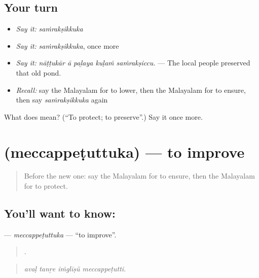 \subsection*{Your turn}
\begin{itemize}
\raggedright
  \item \emph{Say it:} \emph{saṁrakṣikkuka}
  \item \emph{Say it:} \emph{saṁrakṣikkuka}, once more
  \item \emph{Say it:} \emph{nāṭṭukār ā paḻaya kuḷaṁ saṁrakṣiccu.} — The local people preserved that old pond.
  \item \emph{Recall:} say the Malayalam for to lower, then the Malayalam for to ensure, then say \emph{saṁrakṣikkuka} again
\end{itemize}

\begin{tcolorbox}[breakable,colback=teal!4,colframe=teal!35!black,title={Before you move on}]
What does  mean? (\textquotedblleft{}To protect; to preserve\textquotedblright{}.) Say it once more.
\end{tcolorbox}
\section[\texorpdfstring{\ml{മെച്ചപ്പെടുത്തുക} (meccappeṭuttuka)}{മെച്ചപ്പെടുത്തുക (meccappeṭuttuka)}]{ (meccappeṭuttuka) — to improve}

\label{lesson:ML-C450-meccappetuttuka}



\begin{quote}
Before the new one: say the Malayalam for to ensure, then the Malayalam for to protect.
\end{quote}

\subsection*{You'll want to know: }
\textbf{} — \emph{meccappeṭuttuka} — \textquotedblleft{}to improve\textquotedblright{}.

\begin{quote}
   .
\end{quote}

\begin{quote}
\emph{avaḷ tanṟe iṁglīṣŭ meccappeṭutti.}
\end{quote}

